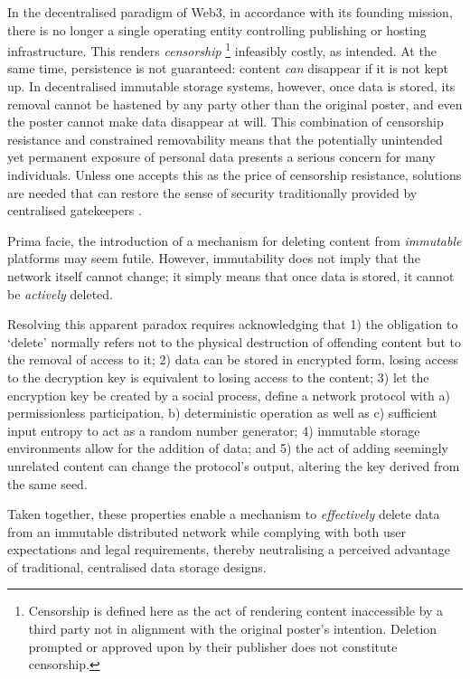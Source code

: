 \documentclass[singlecolumn]{acmart}
\begin{document}
In the decentralised paradigm of Web3, in accordance with its founding mission, there is no longer a single operating entity controlling publishing or hosting infrastructure. This renders \emph{censorship}%
%
\footnote{Censorship is defined here as the act of rendering content inaccessible by a third party not in alignment with the original poster's intention. Deletion prompted or approved upon by their publisher  does not constitute censorship.} 
%
infeasibly costly, as intended. At the same time, persistence is not guaranteed: content \emph{can} disappear if it is not kept up. In decentralised immutable storage systems, however, once data is stored, its removal cannot be hastened by any party other than the original poster, and even the poster cannot make data disappear at will. This combination of censorship resistance and constrained removability means that the potentially unintended yet permanent exposure of personal data presents a serious concern for many individuals. Unless one accepts this as the  price of censorship resistance, solutions are needed that can restore the sense of security traditionally provided by centralised gatekeepers \cite{geambasu2009vanish}. 

Prima facie, the introduction of a mechanism for deleting content from \emph{immutable} platforms may seem futile. However, immutability does not imply that the network itself cannot change; it simply means that once data is stored, it cannot be \emph{actively} deleted.

Resolving this apparent paradox requires acknowledging that 1) the obligation to `delete' normally refers not to the physical destruction of offending content but to the removal of access to it; 2) data can be stored in encrypted form, losing access to the decryption key is equivalent to losing access to the content; 3) let the encryption key be created by a social process, define a network protocol with a) permissionless participation, b) deterministic operation as well as c) sufficient input entropy to act as a  random number generator; 4) immutable storage environments allow for the addition of data; and 5) the act of adding seemingly unrelated content can change the protocol's output, altering the key derived from the same seed. 

Taken together, these properties enable a mechanism to \emph{effectively} delete data from an immutable distributed network while complying with both user expectations and legal requirements, thereby neutralising a perceived advantage of traditional, centralised data storage designs.
\end{document}
